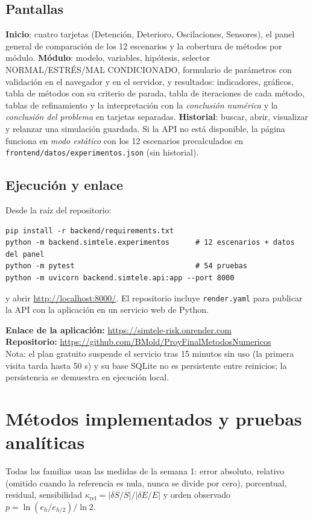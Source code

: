 \documentclass[11pt,letterpaper]{article}
\newcommand{\caja}[1]{\par\noindent\colorbox{fondo}{\parbox{\dimexpr\linewidth-2\fboxsep}{#1}}\par}
\begin{document}
\subsection{Pantallas}
\textbf{Inicio}: cuatro tarjetas (Detención, Deterioro, Oscilaciones, Sensores), el panel general de comparación de los 12 escenarios y la cobertura de métodos por módulo. \textbf{Módulo}: modelo, variables, hipótesis, selector NORMAL/ESTRÉS/MAL CONDICIONADO, formulario de parámetros con validación en el navegador y en el servidor, y resultados: indicadores, gráficos, tabla de métodos con su criterio de parada, tabla de iteraciones de cada método, tablas de refinamiento y la interpretación con la \emph{conclusión numérica} y la \emph{conclusión del problema} en tarjetas separadas. \textbf{Historial}: buscar, abrir, visualizar y relanzar una simulación guardada. Si la API no está disponible, la página funciona en \emph{modo estático} con los 12 escenarios precalculados en \texttt{frontend/datos/experimentos.json} (sin historial).

\subsection{Ejecución y enlace}
Desde la raíz del repositorio:
\begin{verbatim}
pip install -r backend/requirements.txt
python -m backend.simtele.experimentos      # 12 escenarios + datos del panel
python -m pytest                            # 54 pruebas
python -m uvicorn backend.simtele.api:app --port 8000
\end{verbatim}
y abrir \url{http://localhost:8000/}. El repositorio incluye \texttt{render.yaml} para publicar la API con la aplicación en un servicio web de Python.

\caja{\textbf{Enlace de la aplicación:} \url{https://simtele-risk.onrender.com}\\
\textbf{Repositorio:} \url{https://github.com/BMold/ProyFinalMetodosNumericos}\\
Nota: el plan gratuito suspende el servicio tras 15 minutos sin uso (la primera visita tarda hasta 50 s) y su base SQLite no es persistente entre reinicios; la persistencia se demuestra en ejecución local.}

\section{Métodos implementados y pruebas analíticas}
Todas las familias usan las medidas de la semana 1: error absoluto, relativo (omitido cuando la referencia es nula, nunca se divide por cero), porcentual, residual, sensibilidad $\kappa_{\mathrm{rel}}=|\delta S/S|/|\delta E/E|$ y orden observado $p=\ln(e_h/e_{h/2})/\ln 2$.
\end{document}
